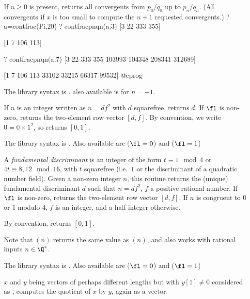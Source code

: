 If $n \geq 0$ is present, returns all convergents from $p_0/q_0$ up to
$p_n/q_n$. (All convergents if $x$ is too small to compute the $n+1$
requested convergents.)
\bprog
? a=contfrac(Pi,20)
? contfracpnqn(a,3)
[3 22 333 355]

[1  7 106 113]

? contfracpnqn(a,7)
[3 22 333 355 103993 104348 208341 312689]

[1  7 106 113  33102  33215  66317  99532]
@eprog

The library syntax is .
also available is  for $n = -1$.

\label{se:core}
If $n$ is an integer written as
$n=df^2$ with $d$ squarefree, returns $d$. If $\fl$ is non-zero,
returns the two-element row vector $[d,f]$. By convention, we write $0 = 0
\times 1^2$, so  returns $[0,1]$.

The library syntax is .
Also available are  ($\fl = 0$) and
 ($\fl = 1$)

\label{se:coredisc}
A \emph{fundamental discriminant} is an integer of the form $t\equiv 1
\mod 4$ or $4t \equiv 8,12 \mod 16$, with $t$ squarefree (i.e.~$1$ or the
discriminant of a quadratic number field). Given a non-zero integer
$n$, this routine returns the (unique) fundamental discriminant $d$
such that $n=df^2$, $f$ a positive rational number. If $\fl$ is non-zero,
returns the two-element row vector $[d,f]$. If $n$ is congruent to
0 or 1 modulo 4, $f$ is an integer, and a half-integer otherwise.

By convention,  returns $[0,1]$.

Note that $(n)$ returns the same value as $(n)$,
and also works with rational inputs $n\in\Q^*$.

The library syntax is .
Also available are  ($\fl = 0$) and
 ($\fl = 1$)

\label{se:dirdiv}
$x$ and $y$ being vectors of perhaps different
lengths but with $y[1]\neq 0$ considered as , computes
the quotient of $x$ by $y$, again as a vector.

